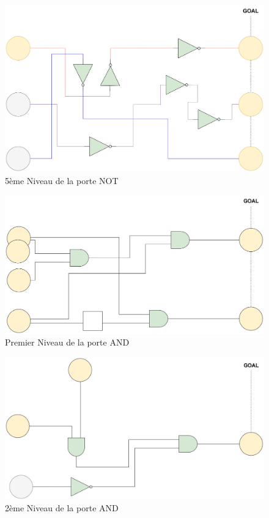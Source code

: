 \documentclass{article}
\begin{document}
\begin{figure}[h]
    \centering
    \includegraphics[width=\textwidth]{img/Levels-NOT-5.jpg}
    \caption{5ème Niveau de la porte NOT}
\end{figure}
\begin{figure}[h]
    \centering
    \includegraphics[width=\textwidth]{img/Levels-AND-1.jpg}
    \caption{Premier Niveau de la porte AND}
\end{figure}
\begin{figure}[h]
    \centering
    \includegraphics[width=\textwidth]{img/Levels-AND-2.jpg}
    \caption{2ème Niveau de la porte AND}
\end{figure}
\end{document}
